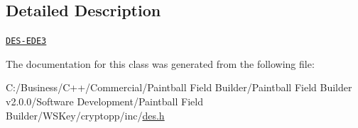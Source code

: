 \subsection{Detailed Description}
\href{http://www.weidai.com/scan-mirror/cs.html#DESede}{\tt DES-\/EDE3} 

The documentation for this class was generated from the following file:\begin{DoxyCompactItemize}
\item 
C:/Business/C++/Commercial/Paintball Field Builder/Paintball Field Builder v2.0.0/Software Development/Paintball Field Builder/WSKey/cryptopp/inc/\hyperlink{des_8h}{des.h}\end{DoxyCompactItemize}
